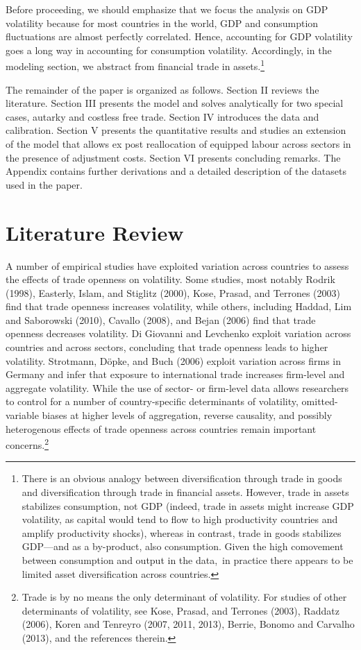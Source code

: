 \documentclass[12pt]{article}
\begin{document}
Before proceeding, we should emphasize that we focus the analysis on GDP
volatility because for most countries in the world, GDP and consumption
fluctuations are almost perfectly correlated. Hence, accounting for GDP
volatility goes a long way in accounting for consumption volatility.
Accordingly, in the modeling section, we abstract from financial trade in
assets.\footnote{%
There is an obvious analogy between diversification through trade in goods
and diversification through trade in financial assets. However, trade in
assets stabilizes consumption, not GDP (indeed, trade in assets might
increase GDP volatility, as capital would tend to flow to high productivity
countries and amplify productivity shocks), whereas in contrast, trade in
goods stabilizes GDP---and as a by-product, also consumption. Given the high
comovement between consumption and output in the data,\ in practice there
appears to be limited asset diversification across countries.}

The remainder of the paper is organized as follows. Section II reviews the
literature. Section III presents the model and solves analytically for two
special cases, autarky and costless free trade. Section IV introduces the
data and calibration. Section V presents the quantitative results and
studies an extension of the model that allows ex post reallocation of
equipped labour across sectors in the presence of adjustment costs. Section
VI presents concluding remarks. The Appendix contains further derivations
and a detailed description of the datasets used in the paper.

\section{Literature Review}

A number of empirical studies have exploited variation across countries to
assess the effects of trade openness on volatility. Some studies, most
notably Rodrik (1998), Easterly, Islam, and Stiglitz (2000), Kose, Prasad,
and Terrones (2003) find that trade openness increases volatility, while
others, including Haddad, Lim and Saborowski (2010), Cavallo (2008), and
Bejan (2006) find that trade openness decreases volatility. Di Giovanni and
Levchenko exploit variation across countries and across sectors, concluding
that trade openness leads to higher volatility. Strotmann, D\"{o}pke, and
Buch (2006) exploit variation across firms in Germany and infer that
exposure to international trade increases firm-level and aggregate
volatility. While the use of sector- or firm-level data allows researchers
to control for a number of country-specific determinants of volatility,
omitted-variable biases at higher levels of aggregation, reverse causality,
and possibly heterogenous effects of trade openness across countries remain
important concerns.\footnote{%
Trade is by no means the only determinant of volatility. For studies of
other determinants of volatility, see Kose, Prasad, and Terrones (2003),
Raddatz (2006), Koren and Tenreyro (2007, 2011, 2013), Berrie, Bonomo and
Carvalho (2013), and the references therein.}
\end{document}
